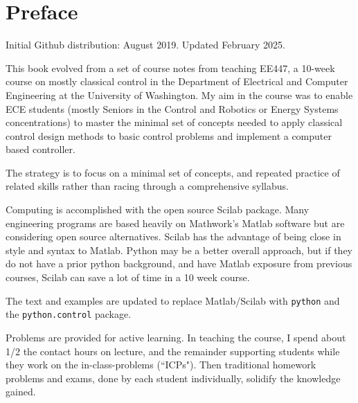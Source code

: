 \chapter*{Preface}

Initial Github distribution: August 2019. Updated February 2025.
\vspace{0.25in}

This book evolved from a set of course notes from teaching EE447,
a 10-week course on mostly classical control in the Department of Electrical and Computer Engineering at the University of Washington. My aim in the course was to enable ECE students (mostly Seniors in the Control and Robotics or Energy Systems concentrations) to  master the minimal set of concepts needed to apply  classical control design methods to basic control problems and implement a computer based controller.

The strategy is to focus on a minimal set of concepts, and repeated practice of related skills rather than racing through a comprehensive syllabus.

Computing is accomplished with the open source Scilab package.  Many engineering programs are based heavily
on Mathwork's  Matlab software but are considering open source alternatives.  Scilab has the advantage of being close in style and syntax to Matlab.
Python may be a better overall approach, but if they do not have a prior python background,
and have Matlab exposure from previous courses, Scilab can save a lot of time in a 10 week course.


The text and examples are updated to replace Matlab/Scilab with {\tt python} and the {\tt  python.control} package.


Problems are provided for active learning.  In teaching the course, I spend about 1/2 the contact
hours on lecture, and the remainder supporting students while they work on the in-class-problems (``ICPs").   Then traditional
homework problems and exams, done by each student individually,
solidify the knowledge gained.

